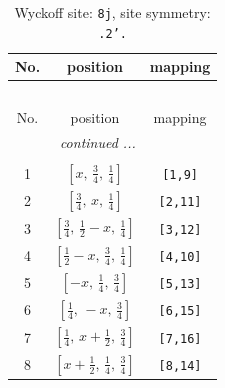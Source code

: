 \documentclass[fleqn,8pt]{jsarticle}
\begin{document}
\begin{longtable}{ccc}
\caption{Wyckoff site: {\tt 8j}, site symmetry: {\tt .2'.}}
 \\
 \hline \hline
No. & position & mapping \\ \hline \endfirsthead

\multicolumn{2}{l}{\tablename\ \thetable{}} \\
 \hline \hline
No. & position & mapping \\ \hline \endhead

 \hline \hline
\multicolumn{2}{r}{\footnotesize\it continued ...} \\ \endfoot

 \hline \hline
\multicolumn{2}{r}{} \\ \endlastfoot

1 & $\left[ x,\, \frac{3}{4},\, \frac{1}{4} \right]$ & {\tt [1,9]} \\ \hline
2 & $\left[ \frac{3}{4},\, x,\, \frac{1}{4} \right]$ & {\tt [2,11]} \\ \hline
3 & $\left[ \frac{3}{4},\, \frac{1}{2} - x,\, \frac{1}{4} \right]$ & {\tt [3,12]} \\ \hline
4 & $\left[ \frac{1}{2} - x,\, \frac{3}{4},\, \frac{1}{4} \right]$ & {\tt [4,10]} \\ \hline
5 & $\left[ - x,\, \frac{1}{4},\, \frac{3}{4} \right]$ & {\tt [5,13]} \\ \hline
6 & $\left[ \frac{1}{4},\, - x,\, \frac{3}{4} \right]$ & {\tt [6,15]} \\ \hline
7 & $\left[ \frac{1}{4},\, x + \frac{1}{2},\, \frac{3}{4} \right]$ & {\tt [7,16]} \\ \hline
8 & $\left[ x + \frac{1}{2},\, \frac{1}{4},\, \frac{3}{4} \right]$ & {\tt [8,14]} \\
\end{longtable}
\renewcommand{\arraystretch}{1.2}
\end{document}
